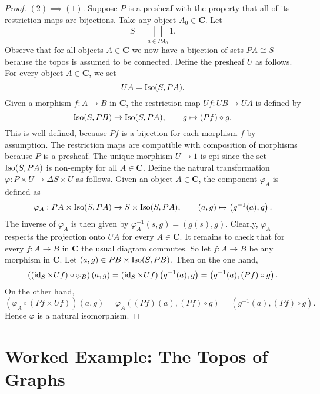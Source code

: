 \begin{proof}
$(2) \implies (1)$. Suppose $P$ is a presheaf with the property that all of its restriction maps are bijections. Take any object $A_0 \in \mathbf{C}$. Let
\[ S = \bigsqcup_{a \in PA_0} 1. \]
Observe that for all objects $A \in \mathbf{C}$ we now have a bijection of sets $PA \cong S$ because the topos is assumed to be connected.
Define the presheaf $U$ as follows. For every object $A \in \mathbf{C}$, we set
\[ UA = \operatorname{Iso}(S, PA). \]
Given a morphism $f : A \to B$ in $\mathbf{C}$, the restriction map $Uf : UB \to UA$ is defined by
\[ \operatorname{Iso}(S, PB) \to \operatorname{Iso}(S, PA), \qquad g \mapsto (Pf) \circ g. \]
This is well-defined, because $Pf$ is a bijection for each morphism $f$ by assumption. The restriction maps are compatible with composition of morphisms because $P$ is a presheaf. The unique morphism $U \to 1$ is epi since the set $\operatorname{Iso}(S, PA)$ is non-empty for all $A \in \mathbf{C}$. Define the natural transformation $\varphi : P \times U \to \Delta S \times U$ as follows. Given an object $A \in \mathbf{C}$, the component $\varphi_A$ is defined as
\[ \varphi_A : PA \times \operatorname{Iso}(S, PA) \to S \times \operatorname{Iso}(S, PA), \qquad (a,g) \mapsto \left(g^{-1}(a), g \right). \]
The inverse of $\varphi_A$ is then given by $\varphi_A^{-1} \left( s, g \right) = (g(s), g)$. Clearly, $\varphi_A$ respects the projection onto $UA$ for every $A \in \mathbf{C}$. It remains to check that for every $f : A \to B$ in $\mathbf{C}$ the usual diagram commutes. So let $f : A \to B$ be any morphism in $\mathbf{C}$. Let $(a,g) \in PB \times \operatorname{Iso}(S, PB)$. Then on the one hand,
\[ \left(\left(\operatorname{id}_S \times Uf\right) \circ \varphi_B\right) \left( a, g \right) = \left( \operatorname{id}_S \times Uf \right)\left(g^{-1}(a), g \right) = \left(g^{-1}(a), \left(Pf \right) \circ g \right). \]
On the other hand,
\[ \left( \varphi_A \circ \left( Pf \times Uf \right) \right)\left(a, g \right) = \varphi_A \left((Pf)(a), (Pf) \circ g \right) = \left( g^{-1}(a), (Pf) \circ g \right). \]
Hence $\varphi$ is a natural isomorphism.
\end{proof}

\newpage
\section{Worked Example: The Topos of Graphs}

